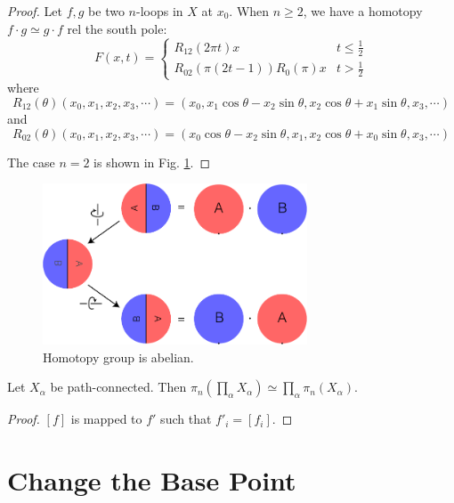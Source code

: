 \documentclass[12pt]{book}
\begin{document}
\begin{proof}
Let $f,g$ be two $n$-loops in $X$ at $x_0$. When $n\geq2$, we have a homotopy $f\cdot g\simeq g\cdot f$ rel the south pole:
	\begin{equation}
		F(x,t)=\left\{
		\begin{array}{cc}
			R_{12}(2\pi t)x&t\leq \frac 12\\
			R_{02}(\pi (2t-1))R_0(\pi)x&t>\frac 12
		\end{array}
		\right.
	\end{equation}
	where
	\begin{equation}
		R_{12}(\theta)(x_0,x_1,x_2,x_3,\cdots)=(x_0,x_1\cos\theta-x_2\sin\theta,x_2\cos\theta+x_1\sin\theta,x_3,\cdots)
	\end{equation}
	and
	\begin{equation}
		R_{02}(\theta)(x_0,x_1,x_2,x_3,\cdots)=(x_0\cos\theta-x_2\sin\theta,x_1,x_2\cos\theta+x_0\sin\theta,x_3,\cdots)
	\end{equation}
	
	The case $n=2$ is shown in Fig. \ref{fig:homotopy_abelian}.
\end{proof}

\begin{figure}[htb!]
	\centering  
	\includegraphics[width=0.7\textwidth ]{resources/chap_bas_cstr/homo_abelian.pdf}  
	\caption{Homotopy group is abelian.}
	\label{fig:homotopy_abelian}
\end{figure}

\begin{lemma}
	Let $X_\alpha$ be path-connected. Then $\pi_n(\prod_\alpha X_\alpha)\simeq \prod_\alpha\pi_n(X_\alpha)$.
\end{lemma}
\begin{proof}
	$[f]$ is mapped to $f'$ such that $f'_i=[f_i]$.
\end{proof}

\section{Change the Base Point}
\end{document}
